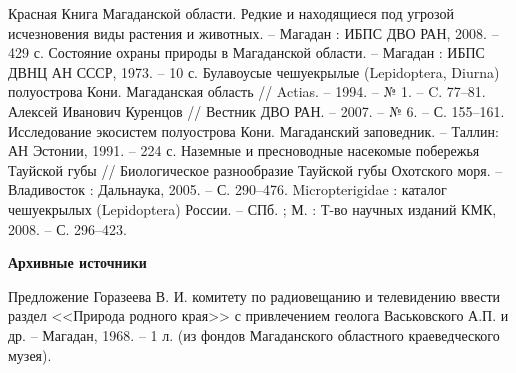 \begin{thebibliography}{99}

\bibitem{} Красная Книга Магаданской области. Редкие и находящиеся под угрозой исчезновения виды растения и животных. – Магадан : ИБПС ДВО РАН, 2008. – 429 с.
\bibitem{} Состояние охраны природы в Магаданской области. – Магадан : ИБПС ДВНЦ АН СССР, 1973. – 10 с.
\bibitem{} Булавоусые чешуекрылые (Lepidoptera, Diurna) полуострова Кони. Магаданская область // Actias. – 1994. – № 1. – C. 77–81.
\bibitem{} Алексей Иванович Куренцов // Вестник ДВО РАН. – 2007. – № 6. – С. 155–161.
\bibitem{} Исследование экосистем полуострова Кони. Магаданский заповедник. – Таллин: АН Эстонии, 1991. – 224 с.
\bibitem{} Наземные и пресноводные насекомые побережья Тауйской губы // Биологическое разнообразие Тауйской губы Охотского моря. – Владивосток : Дальнаука, 2005. – С. 290–476.
\bibitem{} Micropterigidae : каталог чешуекрылых (Lepidoptera) России. – СПб. ; М. : Т-во научных изданий КМК, 2008. – С. 296–423.

\textbf{Архивные источники}

\bibitem{}Предложение Горазеева В. И. комитету по радиовещанию и телевидению ввести раздел <<Природа родного края>> с привлечением геолога Васьковского А.П. и др. – Магадан, 1968. – 1 л. (из фондов Магаданского областного краеведческого музея).
\end{thebibliography}
